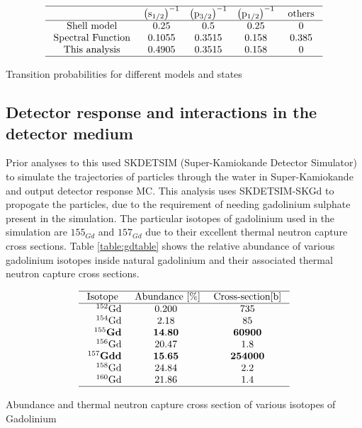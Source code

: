 \begin{table}
$$
\begin{array}{ccccc}
\hline & \left(\mathrm{s}_{1 / 2}\right)^{-1} & \left(\mathrm{p}_{3 / 2}\right)^{-1} & \left(\mathrm{p}_{1 / 2}\right)^{-1} & \text { others } \\
\hline \text { Shell model } & 0.25 & 0.5 & 0.25 & 0 \\
\text { Spectral Function } & 0.1055 & 0.3515 & 0.158 & 0.385 \\
\text { This analysis } & 0.4905 & 0.3515 & 0.158 & 0 \\
\hline
\end{array}
$$
\caption{Transition probabilities for different models and states}
\label{table:transitionprob}
\end{table}

\subsection{Detector response and interactions in the detector medium}

Prior analyses to this used SKDETSIM (Super-Kamiokande Detector Simulator) to simulate the trajectories of particles through the water in Super-Kamiokande and output detector response MC. This analysis uses SKDETSIM-SKGd to propogate the particles, due to the requirement of needing gadolinium sulphate present in the simulation. The particular isotopes of gadolinium used in the simulation are $155_{Gd}$ and $157_{Gd}$ due to their excellent thermal neutron capture cross sections. Table \ref{table:gdtable} shows the relative abundance of various gadolinium isotopes inside natural gadolinium and their associated thermal neutron capture cross sections.

\begin{table}
$$
\begin{array}{rcc}
\hline \text { Isotope } & \text { Abundance }[\%] & \text { Cross-section[b] } \\
\hline{ }^{152} \mathrm{Gd} & 0.200 & 735 \\
{ }^{154} \mathrm{Gd} & 2.18 & 85 \\
{ }^{155} \mathbf{Gd} & \mathbf{1 4 . 8 0} & \mathbf{6 0 9 0 0} \\
{ }^{156} \mathrm{Gd} & 20.47 & 1.8 \\
{ }^{157} \mathbf{Gd} \mathbf{d} & \mathbf{1 5 . 6 5} & \mathbf{2 5 4 0 0 0} \\
{ }^{158} \mathrm{Gd} & 24.84 & 2.2 \\
{ }^{160} \mathrm{Gd} & 21.86 & 1.4 \\
\hline
\end{array}
$$
\caption{Abundance and thermal neutron capture cross section of various isotopes of Gadolinium}
\label{table:gdtable}
\end{table}

